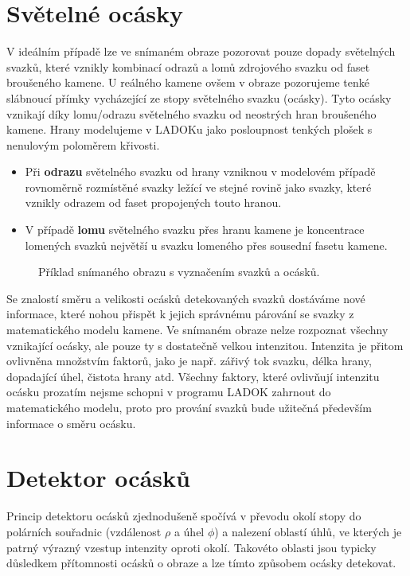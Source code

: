 \section*{Světelné ocásky}
	V ideálním případě lze ve snímaném obraze pozorovat pouze dopady světelných svazků, které vznikly kombinací odrazů a lomů zdrojového svazku od faset broušeného kamene. U reálného kamene ovšem v obraze pozorujeme tenké slábnoucí přímky vycházející ze stopy světelného svazku (ocásky). Tyto ocásky vznikají díky lomu/odrazu světelného svazku od neostrých hran broušeného kamene. Hrany modelujeme v LADOKu jako posloupnost tenkých plošek s nenulovým poloměrem křivosti.
	
\begin{itemize}
	\item Při \textbf{odrazu} světelného svazku od hrany vzniknou v modelovém případě rovnoměrně rozmístěné svazky ležící ve stejné rovině jako svazky, které vznikly odrazem od faset propojených touto hranou.  	

	\item V případě \textbf{lomu} světelného svazku přes hranu kamene je koncentrace lomených svazků největší u svazku lomeného přes sousední fasetu kamene.  
\end{itemize}	  

\begin{figure}[h!]
\begin{center}
\scalebox{.9}{ }
\end{center}
\caption{Příklad snímaného obrazu s vyznačením svazků a ocásků.}
\label{fig:tail_ex1}
\end{figure}

	Se znalostí směru a velikosti ocásků detekovaných svazků dostáváme nové informace, které nohou přispět k jejich správnému párování se svazky z matematického modelu kamene.
	Ve snímaném obraze nelze rozpoznat všechny vznikající ocásky, ale pouze ty s dostatečně velkou intenzitou. Intenzita je přitom ovlivněna množstvím faktorů, jako je např. zářivý tok svazku, délka hrany, dopadající úhel, čistota hrany atd. Všechny faktory, které ovlivňují intenzitu ocásku prozatím nejsme schopni v programu LADOK zahrnout do matematického modelu, proto pro prování svazků bude užitečná především informace o směru ocásku. 
	
	
\section*{Detektor ocásků}
	Princip detektoru ocásků zjednodušeně spočívá v převodu okolí stopy do polárních souřadnic (vzdálenost $\rho$ a úhel $\phi$) a nalezení oblastí úhlů, ve kterých je patrný výrazný vzestup intenzity oproti okolí. Takovéto oblasti jsou typicky důsledkem přítomnosti ocásků o obraze a lze tímto způsobem ocásky detekovat. 
	
